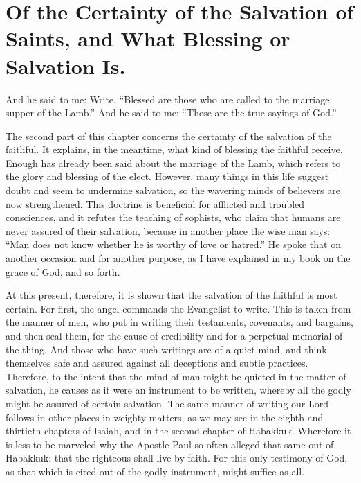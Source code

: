 \chapter[Sermon 83. Of the Certainty of the Salvation of Saints, and What Blessing or Salvation Is.]{Of the Certainty of the Salvation of Saints, and What Blessing or Salvation Is.}
\label{sermon:083}

And he said to me: Write, “Blessed are those who are called to the marriage supper of the Lamb.” And he said to me: “These are the true sayings of God.”

The second part of this chapter concerns the certainty of the salvation of the faithful. It explains, in the meantime, what kind of blessing the faithful receive. Enough has already been said about the marriage of the Lamb, which refers to the glory and blessing of the elect. However, many things in this life suggest doubt and seem to undermine salvation, so the wavering minds of believers are now strengthened. This doctrine is beneficial for afflicted and troubled consciences, and it refutes the teaching of sophists, who claim that humans are never assured of their salvation, because in another place the wise man says: “Man does not know whether he is worthy of love or hatred.” He spoke that on another occasion and for another purpose, as I have explained in my book on the grace of God, and so forth.

At this present, therefore, it is shown that the salvation of the faithful is most certain. For first, the angel commands the Evangelist to write. This is taken from the manner of men, who put in writing their testaments, covenants, and bargains, and then seal them, for the cause of credibility and for a perpetual memorial of the thing. And those who have such writings are of a quiet mind, and think themselves safe and assured against all deceptions and subtle practices. Therefore, to the intent that the mind of man might be quieted in the matter of salvation, he causes as it were an instrument to be written, whereby all the godly might be assured of certain salvation. The same manner of writing our Lord follows in other places in weighty matters, as we may see in the eighth and thirtieth chapters of Isaiah, and in the second chapter of Habakkuk. Wherefore it is less to be marveled why the Apostle Paul so often alleged that same out of Habakkuk: that the righteous shall live by faith. For this only testimony of God, as that which is cited out of the godly instrument, might suffice as all.


